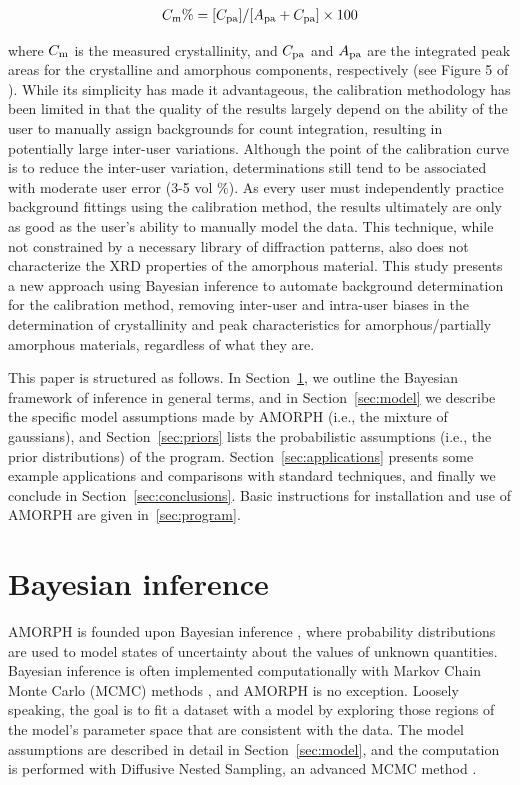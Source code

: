 \documentclass[preprint, a4paper]{elsarticle}
\begin{document}
\begin{align}
C_{\rm m} \% = [C_{\rm pa}]/[A_{\rm pa} + C_{\rm pa}] \times 100
\end{align}

where $C_{\rm m}$ is the measured crystallinity, and $C_{\rm pa}$ and $A_{\rm pa}$ are the integrated peak areas for the
crystalline and amorphous components, respectively (see Figure 5 of \citet{wall2014}). 
While its simplicity has made it advantageous, the calibration methodology has been limited in that
the quality of the results largely depend on the ability of the user to manually assign
backgrounds for count integration, resulting in potentially large inter-user variations. Although the
point of the calibration curve is to reduce the inter-user variation, determinations still tend to
be associated with moderate user error (3-5 vol \%). As every user must independently practice
background fittings using the calibration method, the results ultimately are only as good as the
user’s ability to manually model the data. This technique, while not constrained by a
necessary library of diffraction patterns, also does not characterize the XRD properties of the
amorphous material. This study presents a new approach using Bayesian inference to automate
background determination for the calibration method, removing inter-user and intra-user biases in
the determination of crystallinity and peak characteristics for amorphous/partially amorphous
materials, regardless of what they are. 

This paper is structured as follows. In Section~\ref{sec:bayes}, we outline the Bayesian
framework of inference in general terms, and in Section~\ref{sec:model} we describe the
specific model assumptions made by AMORPH (i.e., the mixture of gaussians), and
Section~\ref{sec:priors} lists the probabilistic assumptions (i.e., the prior distributions) of the program. Section~\ref{sec:applications} presents some
example applications and comparisons with standard techniques, and finally we conclude
in Section~\ref{sec:conclusions}. Basic instructions for installation and use of AMORPH are given in~\ref{sec:program}.

\section{Bayesian inference}\label{sec:bayes}
AMORPH is founded upon Bayesian inference
\citep{gregory2005bayesian, o2004kendall, sivia2006data}, where
probability distributions are used to model
states of uncertainty about the values of unknown quantities.
Bayesian inference is often implemented computationally with
Markov Chain Monte Carlo (MCMC) methods \citep{mackay2003}, and AMORPH is no exception.
Loosely speaking, the goal is to fit a dataset with a model by exploring
those regions of the model's parameter space that are consistent with the
data. The model assumptions are described in detail in
Section~\ref{sec:model}, and the computation is performed with
Diffusive Nested Sampling, an advanced MCMC method \citep{dns, dnest4}.
\end{document}
